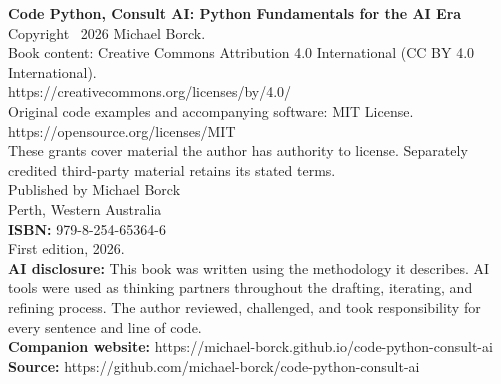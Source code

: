 \thispagestyle{empty}
\vspace*{\fill}

\begin{flushleft}
\textbf{Code Python, Consult AI: Python Fundamentals for the AI Era}\\[1.5em]
Copyright \textcopyright\ 2026 Michael Borck.\\[1em]
Book content: Creative Commons Attribution 4.0 International (CC BY 4.0 International).\\
https://creativecommons.org/licenses/by/4.0/\\[0.5em]
Original code examples and accompanying software: MIT License.\\
https://opensource.org/licenses/MIT\\[0.5em]
These grants cover material the author has authority to license. Separately credited third-party material retains its stated terms.\\[1em]
Published by Michael Borck\\
Perth, Western Australia\\[1em]
\textbf{ISBN:} 979-8-254-65364-6\\[1em]
First edition, 2026.\\[1em]
\textbf{AI disclosure:} This book was written using the methodology it describes. AI tools were used as thinking partners throughout the drafting, iterating, and refining process. The author reviewed, challenged, and took responsibility for every sentence and line of code.\\[1em]
\textbf{Companion website:} https://michael-borck.github.io/code-python-consult-ai\\
\textbf{Source:} https://github.com/michael-borck/code-python-consult-ai
\end{flushleft}

\vspace*{\fill}
\clearpage
